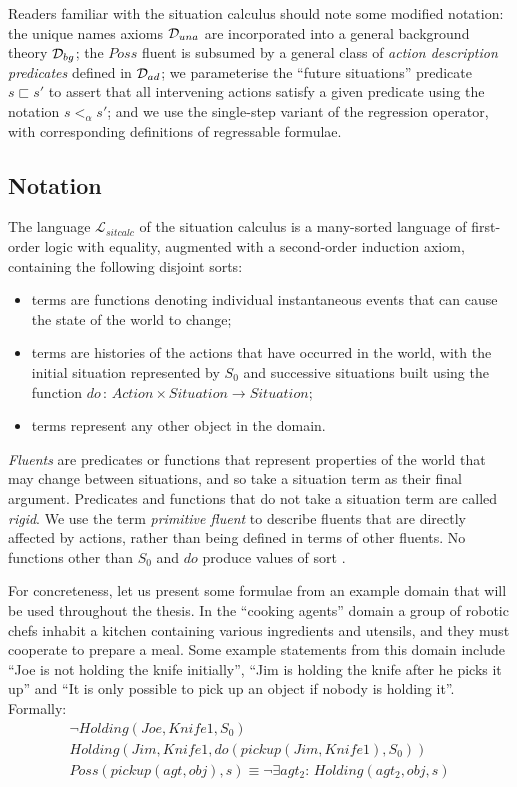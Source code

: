 Readers familiar with the situation calculus should note some modified
notation: the unique names axioms $\mathcal{D}_{una}$ are incorporated into
a general background theory $\mathcal{D}_{bg}$; the $Poss$ fluent is subsumed
by a general class of \emph{action description predicates} defined
in $\mathcal{D}_{ad}$; we parameterise the {}``future situations'' predicate
$s\sqsubset s'$ to assert that all intervening actions satisfy a
given predicate using the notation $s<_{\alpha}s'$; and we use the
single-step variant of the regression operator, with corresponding
definitions of regressable formulae.


\subsection{Notation\label{sec:Background:SC:Notation}}

The language $\mathcal{L}_{sitcalc}$ of the situation calculus is
a many-sorted language of first-order logic with equality, augmented
with a second-order induction axiom, containing the following disjoint
sorts:

\begin{itemize}
\item \emph{} terms are functions denoting individual instantaneous
events that can cause the state of the world to change; 
\item {} terms are histories of the actions that have occurred
in the world, with the initial situation represented by $S_{0}$ and
successive situations built using the function $do\,:\, Action\times Situation\rightarrow Situation$; 
\item {} terms represent any other object in the domain. 
\end{itemize}
\emph{Fluents} are predicates or functions that represent properties
of the world that may change between situations, and so take a situation
term as their final argument. Predicates and functions that do not
take a situation term are called \emph{rigid}. We use the term \emph{primitive
fluent} to describe fluents that are directly affected by actions,
rather than being defined in terms of other fluents. No functions
other than $S_{0}$ and $do$ produce values of sort .

For concreteness, let us present some formulae from an example domain
that will be used throughout the thesis. In the {}``cooking agents''
domain a group of robotic chefs inhabit a kitchen containing various
ingredients and utensils, and they must cooperate to prepare a meal.
Some example statements from this domain include {}``Joe is not holding
the knife initially'', {}``Jim is holding the knife after he picks
it up'' and {}``It is only possible to pick up an object if nobody
is holding it''. Formally:\begin{gather*}
\neg Holding(Joe,Knife1,S_{0})\\
Holding(Jim,Knife1,do(pickup(Jim,Knife1),S_{0}))\\
Poss(pickup(agt,obj),s)\equiv\neg\exists agt_{2}:\, Holding(agt_{2},obj,s)\end{gather*}


